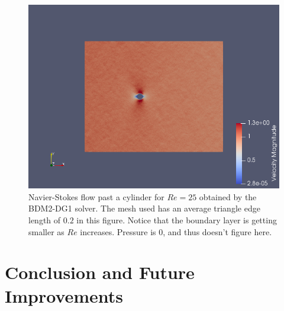 \documentclass[11pt,twoside,a4paper]{article}
\begin{document}
\begin{figure}
  \includegraphics[width=\linewidth]{nscR25.png}
  \caption{Navier-Stokes flow past a cylinder for $Re = 25$ obtained by the BDM2-DG1 solver. The mesh used has an average triangle edge length of $0.2$ in this figure. Notice that the boundary layer is getting smaller as $Re$ increases. Pressure is $0$, and thus doesn't figure here.}
\end{figure}

\section{Conclusion and Future Improvements}
\end{document}
